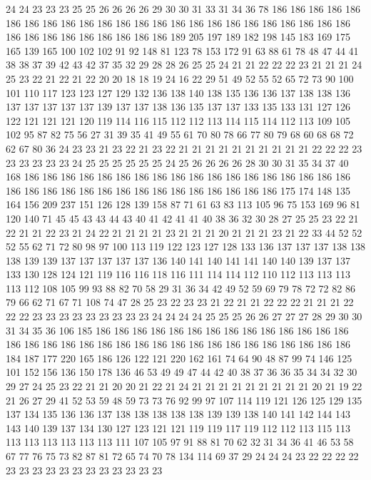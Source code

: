 24 24 23 23 23 25 25 26 26 26 26 29 30 30 31 33 31 34 36 78
186 186 186 186 186 186 186 186 186 186 186 186 186 186 186 186 186 186 186 186
186 186 186 186 186 186 186 186 186 186 186 186 186 189 205 197 189 182 198 145
183 169 175 165 139 165 100 102 102 91 92 148 81 123 78 153 172 91 63 88
61 78 48 47 44 41 38 38 37 39 42 43 42 37 35 32 29 28 28 26
25 25 24 21 21 22 22 22 23 21 21 21 24 25 23 22 21 22 21 22
20 20 18 18 19 24 16 22 29 51 49 52 55 52 65 72 73 90 100 101
110 117 123 123 127 129 132 136 138 140 138 135 136 136 137 138 138 136 137 137
137 137 137 139 137 137 138 136 135 137 137 133 135 133 131 127 126 122 121 121
121 120 119 114 116 115 112 112 113 114 115 114 112 113 109 105 102 95 87 82
75 56 27 31 39 35 41 49 55 61 70 80 78 66 77 80 79 68 60 68
68 72 62 67 80 36 24 23 23 21 23 22 21 23 22 21 21 21 21 21
21 21 21 21 21 22 22 22 23 23 23 23 23 23 24 25 25 25 25 25
25 24 25 26 26 26 26 28 30 30 31 35 34 37 40 168 186 186 186 186
186 186 186 186 186 186 186 186 186 186 186 186 186 186 186 186 186 186 186 186
186 186 186 186 186 186 186 186 186 175 174 148 135 164 156 209 237 151 126 128
139 158 87 71 61 63 83 113 105 96 75 153 169 96 81 120 140 71 45 45
43 43 44 43 40 41 42 41 41 40 38 36 32 30 28 27 25 25 23 22
21 22 21 21 22 23 21 24 22 21 21 21 21 23 21 21 21 20 21 21
21 23 21 22 33 44 52 52 52 55 62 71 72 80 98 97 100 113 119 122
123 127 128 133 136 137 137 137 138 138 138 139 139 137 137 137 137 137 136 140
141 140 141 141 140 140 139 137 137 133 130 128 124 121 119 116 116 118 116 111
114 114 112 110 112 113 113 113 113 112 108 105 99 93 88 82 70 58 29 31
36 34 42 49 52 59 69 79 78 72 72 82 86 79 66 62 71 67 71 108
74 47 28 25 23 22 23 23 21 22 21 21 22 22 22 21 21 21 22 22
22 23 23 23 23 23 23 23 23 23 24 24 24 24 25 25 25 26 26 27
27 27 28 29 30 30 31 34 35 36 106 185 186 186 186 186 186 186 186 186
186 186 186 186 186 186 186 186 186 186 186 186 186 186 186 186 186 186 186 186
186 186 186 186 186 184 187 177 220 165 186 126 122 121 220 162 161 74 64 90
48 87 99 74 146 125 101 152 156 136 150 178 136 46 53 49 49 47 44 42
40 38 37 36 36 35 34 34 32 30 29 27 24 25 23 22 21 21 20 20
21 22 21 24 21 21 21 21 21 21 21 21 21 20 21 19 22 21 26 27
29 41 52 53 59 48 59 73 73 76 92 99 97 107 114 119 121 126 125 129
135 137 134 135 136 136 137 138 138 138 138 138 139 139 138 140 141 142 144 143
143 140 139 137 134 130 127 123 121 121 119 119 117 119 112 112 113 115 113 113
113 113 113 113 113 111 107 105 97 91 88 81 70 62 32 31 34 36 41 46
53 58 67 77 76 75 73 82 87 81 72 65 74 70 78 134 114 69 37 29
24 24 24 23 22 22 22 22 23 23 23 23 23 23 23 23 23 23 23 23
